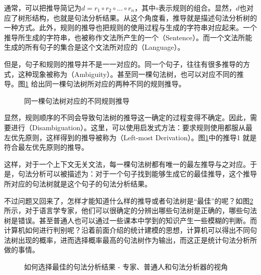 \parinterval 通常，可以把推导简记为$d=r_1 \circ r_2 \circ ... \circ r_n$，其中$ \circ $表示规则的组合。显然，$d$也对应了树形结构，也就是句法分析结果。从这个角度看，推导就是描述句法分析树的一种方式。此外，规则的推导也把规则的使用过程与生成的字符串对应起来。一个推导所生成的字符串，也被称作文法所产生的一个{\small{}}（Sentence）。而一个文法所能生成的所有句子的集合是这个文法所对应的{\small{}}（Language）。

\parinterval 但是，句子和规则的推导并不是一一对应的。同一个句子，往往有很多推导的方式，这种现象被称为{\small{}}（Ambiguity）。甚至同一棵句法树，也可以对应不同的推导。图\ref{fig:2-23} 给出同一棵句法树所对应的两种不同的规则推导。

\begin{figure}[htp]
    \centering

\setlength{\abovecaptionskip}{-0.5em}
	\caption{同一棵句法树对应的不同规则推导}
    \label{fig:2-23}
\end{figure}

\parinterval 显然，规则顺序的不同会导致句法树的推导这一确定的过程变得不确定。因此，需要进行{\small{}}（Disambiguation）。这里，可以使用启发式方法：要求规则使用都服从最左优先原则，这样得到的推导被称为{\small{}}（Left-most Derivation）。图\ref{fig:2-23}中的推导1 就是符合最左优先原则的推导。

\parinterval 这样，对于一个上下文无关文法，每一棵句法树都有唯一的最左推导与之对应。于是，句法分析可以被描述为：对于一个句子找到能够生成它的最佳推导，这个推导所对应的句法树就是这个句子的句法分析结果。

\parinterval 不过问题又回来了，怎样才能知道什么样的推导或者句法树是``最佳''的呢？如图\ref{fig:2-24}所示，对于语言学专家，他们可以很确定的分辨出哪些句法树是正确的，哪些句法树是错误。甚至普通人也可以通过一些课本中学到的知识产生一些模糊的判断。而计算机如何进行判别呢？沿着前面介绍的统计建模的思想，计算机可以得出不同句法树出现的概率，进而选择概率最高的句法树作为输出，而这正是统计句法分析所做的事情。

\begin{figure}[htp]
    \centering

	\caption{如何选择最佳的句法分析结果 - 专家、普通人和句法分析器的视角}
    \label{fig:2-24}
\end{figure}

